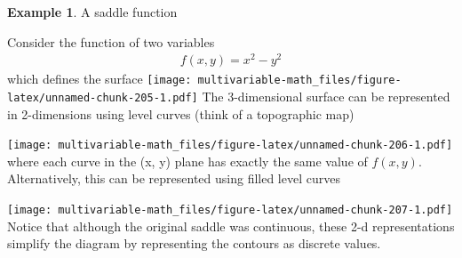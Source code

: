 \documentclass[
]{book}
\newenvironment{Shaded}{\begin{snugshade}}{\end{snugshade}}
\newcommand{\DataTypeTok}[1]{\textcolor[rgb]{0.13,0.29,0.53}{#1}}
\newcommand{\DecValTok}[1]{\textcolor[rgb]{0.00,0.00,0.81}{#1}}
\newcommand{\KeywordTok}[1]{\textcolor[rgb]{0.13,0.29,0.53}{\textbf{#1}}}
\newcommand{\NormalTok}[1]{#1}
\newcommand{\OperatorTok}[1]{\textcolor[rgb]{0.81,0.36,0.00}{\textbf{#1}}}
\newcommand{\StringTok}[1]{\textcolor[rgb]{0.31,0.60,0.02}{#1}}
\theoremstyle{definition}
\theoremstyle{definition}
\newtheorem{example}{Example}[chapter]
\theoremstyle{definition}
\theoremstyle{definition}
\theoremstyle{remark}
\begin{document}
\begin{example}
A saddle function

Consider the function of two variables
\[
\begin{aligned}
f(x, y) = x^2 - y^2
\end{aligned}
\]
which defines the surface
\texttt{[image: multivariable-math\_files/figure-latex/unnamed-chunk-205-1.pdf]}
The 3-dimensional surface can be represented in 2-dimensions using level curves (think of a topographic map)

\begin{Shaded}
\end{Shaded}

\texttt{[image: multivariable-math\_files/figure-latex/unnamed-chunk-206-1.pdf]}
where each curve in the (x, y) plane has exactly the same value of \(f(x, y)\). Alternatively, this can be represented using filled level curves

\begin{Shaded}
\end{Shaded}

\texttt{[image: multivariable-math\_files/figure-latex/unnamed-chunk-207-1.pdf]}
Notice that although the original saddle was continuous, these 2-d representations simplify the diagram by representing the contours as discrete values.
\end{example}
\end{document}
